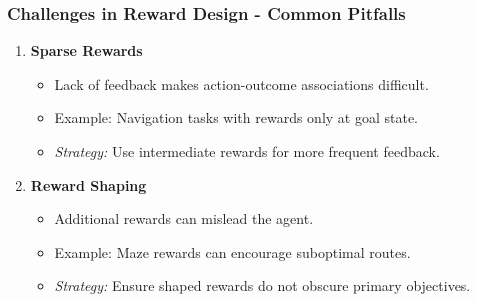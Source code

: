 \documentclass[aspectratio=169]{beamer}
\begin{document}
\begin{frame}[fragile]
    \frametitle{Challenges in Reward Design - Common Pitfalls}
    \begin{enumerate}
        \item \textbf{Sparse Rewards}
            \begin{itemize}
                \item Lack of feedback makes action-outcome associations difficult.
                \item Example: Navigation tasks with rewards only at goal state.
                \item \textit{Strategy:} Use intermediate rewards for more frequent feedback.
            \end{itemize}
        
        \item \textbf{Reward Shaping}
            \begin{itemize}
                \item Additional rewards can mislead the agent.
                \item Example: Maze rewards can encourage suboptimal routes.
                \item \textit{Strategy:} Ensure shaped rewards do not obscure primary objectives.
            \end{itemize}
    \end{enumerate}
\end{frame}
\end{document}
